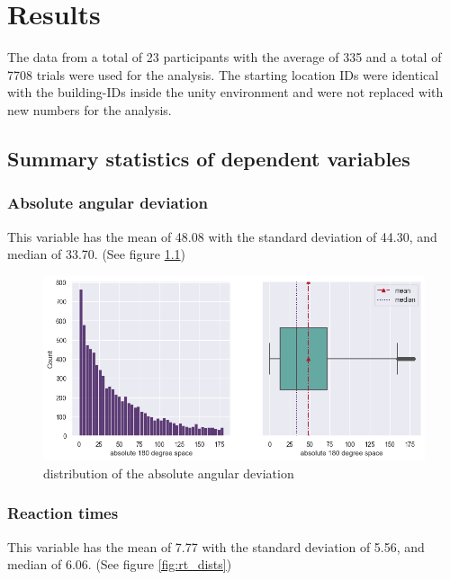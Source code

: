 \chapter{Results}

The data from a total of 23 participants with the average of 335 and a total of 7708 trials were used for the analysis. The starting location IDs were identical with the building-IDs inside the unity environment and were not replaced with new numbers for the analysis.

\section{Summary statistics of dependent variables}

\subsection{Absolute angular deviation}

This variable has the mean of 48.08 with the standard deviation of 44.30, and median of 33.70. (See figure \ref{fig:angular_dev_dists})

\begin{figure}[!htb]
	\centering
	\includegraphics[width=150mm]{figures/angular_deviation_hist_box_23.png}
	\caption[Distribution of the absolute angular deviation]{distribution of the absolute angular deviation}
	\label{fig:angular_dev_dists}
\end{figure}

\subsection{Reaction times}

This variable has the mean of 7.77 with the standard deviation of 5.56, and median of 6.06. (See figure \ref{fig:rt_dists})

